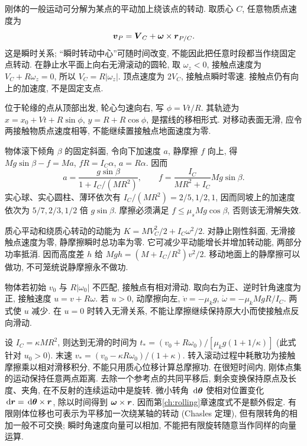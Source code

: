 \label{ch:rolling}
刚体的一般运动可分解为某点的平动加上绕该点的转动. 取质心 $C$, 任意物质点速度为
\begin{equation}
\boldsymbol{v}_P=\boldsymbol{V}_C+\boldsymbol{\omega}\times\boldsymbol{r}_{P/C}.
\end{equation}
这是瞬时关系; “瞬时转动中心”可随时间改变, 不能因此把任意时段都当作绕固定点转动. 在静止水平面上向右无滑滚动的圆轮, 取 $\omega_z<0$, 接触点速度为 $V_C+R\omega_z=0$, 所以 $V_C=R|\omega_z|$. 顶点速度为 $2V_C$, 接触点瞬时零速. 接触点仍有向上的加速度, 不是固定支点.

位于轮缘的点从顶部出发, 轮心匀速向右, 写 $\phi=Vt/R$. 其轨迹为 $x=x_0+Vt+R\sin\phi$, $y=R+R\cos\phi$, 是摆线的移相形式. 对移动表面无滑, 应令两接触物质点速度相等, 不能继续置接触点地面速度为零.

物体滚下倾角 $\beta$ 的固定斜面, 令向下加速度 $a$, 静摩擦 $f$ 向上, 得 $Mg\sin\beta-f=Ma$, $fR=I_C\alpha$, $a=R\alpha$. 因而
\begin{equation}
a=\frac{g\sin\beta}{1+I_C/(MR^2)},\qquad
f=\frac{I_C}{MR^2+I_C}Mg\sin\beta.
\end{equation}
实心球、实心圆柱、薄环依次有 $I_C/(MR^2)=2/5,1/2,1$, 因而同坡上的加速度依次为 $5/7,2/3,1/2$ 倍 $g\sin\beta$. 摩擦必须满足 $f\le\mu_sMg\cos\beta$, 否则该无滑解失效.

质心平动和绕质心转动的动能为 $K=MV_C^2/2+I_C\omega^2/2$. 对静止刚性斜面, 无滑接触点速度为零, 静摩擦瞬时总功率为零. 它可减少平动能增长并增加转动能, 两部分功率抵消. 因而高度差 $h$ 给 $Mgh=(M+I_C/R^2)v^2/2$. 移动地面上的静摩擦可以做功, 不可笼统说静摩擦永不做功.

物体若初始 $v_0$ 与 $R|\omega_0|$ 不匹配, 接触点有相对滑动. 取向右为正、逆时针角速度为正, 接触速度 $u=v+R\omega$. 若 $u>0$, 动摩擦向左, $\dot v=-\mu_kg$, $\dot\omega=-\mu_kMgR/I_C$. 两式使 $u$ 减少. 在 $u=0$ 时转入无滑关系, 不能让摩擦继续保持原大小而使接触点反向滑动.

设 $I_C=\kappa MR^2$, 则达到无滑的时间为 $t_*=(v_0+R\omega_0)/[\mu_kg(1+1/\kappa)]$ (此式针对 $u_0>0$). 末速 $v_*=(v_0-\kappa R\omega_0)/(1+\kappa)$. 转入滚动过程中耗散功为接触摩擦乘以相对滑移积分, 不能只用质心位移计算总摩擦功.
在很短时间内, 刚体点集的运动保持任意两点距离. 去除一个参考点的共同平移后, 剩余变换保持原点及长度、夹角, 在不反射的连续运动中是旋转. 微小转角 $\,\mathrm d\boldsymbol{\theta}$ 使相对位置变化 $\,\mathrm d\boldsymbol{r}=\,\mathrm d\boldsymbol{\theta}\times\boldsymbol{r}$, 除以时间得到 $\boldsymbol{\omega}\times\boldsymbol{r}$. 因而第\ref{ch:rolling}章速度式不是额外假定. 有限刚体位移也可表示为平移加一次绕某轴的转动 (Chasles 定理), 但有限转角的相加一般不可交换; 瞬时角速度向量可以相加, 不能把有限旋转随意当作同样的向量运算.
